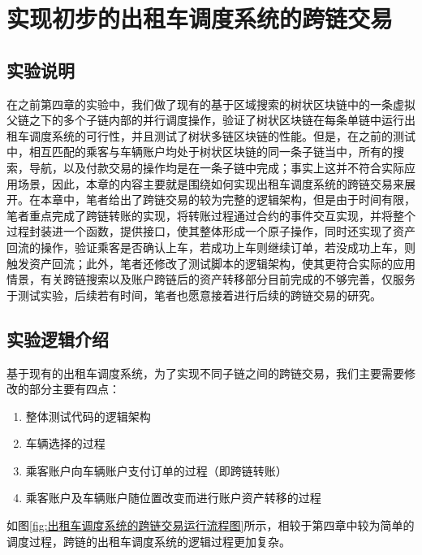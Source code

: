 
\chapter{实现初步的出租车调度系统的跨链交易}

\section{实验说明}

在之前第四章的实验中，我们做了现有的基于区域搜索的树状区块链中的一条虚拟父链之下的多个子链内部的并行调度操作，验证了树状区块链在每条单链中运行出租车调度系统的可行性，并且测试了树状多链区块链的性能。但是，在之前的测试中，相互匹配的乘客与车辆账户均处于树状区块链的同一条子链当中，所有的搜索，导航，以及付款交易的操作均是在一条子链中完成；事实上这并不符合实际应用场景，因此，本章的内容主要就是围绕如何实现出租车调度系统的跨链交易来展开。在本章中，笔者给出了跨链交易的较为完整的逻辑架构，但是由于时间有限，笔者重点完成了跨链转账的实现，将转账过程通过合约的事件交互实现，并将整个过程封装进一个函数，提供接口，使其整体形成一个原子操作，同时还实现了资产回流的操作，验证乘客是否确认上车，若成功上车则继续订单，若没成功上车，则触发资产回流；此外，笔者还修改了测试脚本的逻辑架构，使其更符合实际的应用情景，有关跨链搜索以及账户跨链后的资产转移部分目前完成的不够完善，仅服务于测试实验，后续若有时间，笔者也愿意接着进行后续的跨链交易的研究。

\section{实验逻辑介绍}

基于现有的出租车调度系统，为了实现不同子链之间的跨链交易，我们主要需要修改的部分主要有四点：

\begin{enumerate}
    \item 整体测试代码的逻辑架构
    \item 车辆选择的过程
    \item 乘客账户向车辆账户支付订单的过程（即跨链转账）
    \item 乘客账户及车辆账户随位置改变而进行账户资产转移的过程
\end{enumerate}

如图\ref{fig:出租车调度系统的跨链交易运行流程图}所示，相较于第四章中较为简单的调度过程，跨链的出租车调度系统的逻辑过程更加复杂。

